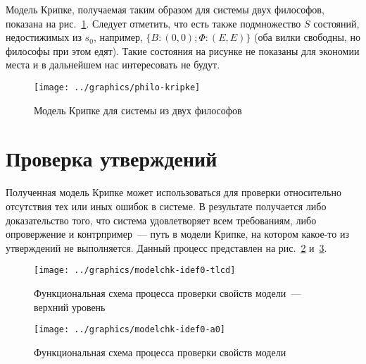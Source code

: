 Модель Крипке, получаемая таким образом для системы двух философов, показана на
рис.~\ref{fig:philo2-kripke}. Следует отметить, что есть также подмножество $S$ состояний,
недостижимых из $s_0$, например, $\{B: (0, 0); \Phi: (E, E)\}$ (оба вилки свободны, но
философы при этом едят). Такие состояния на рисунке не показаны для экономии места и в
дальнейшем нас интересовать не будут.

\begin{figure}[ht]
  \centering
  \texttt{[image: ../graphics/philo-kripke]}
  \caption{Модель Крипке для системы из двух философов}
  \label{fig:philo2-kripke}
\end{figure}

\section{Проверка утверждений}
\label{sec:kripke-verification}

Полученная модель Крипке может использоваться для проверки относительно отсутствия тех или
иных ошибок в системе. В результате получается либо доказательство того, что система
удовлетворяет всем требованиям, либо опровержение и контрпример~--- путь в модели Крипке,
на котором какое-то из утверждений не выполняется. Данный процесс представлен на
рис.~\ref{fig:modelchk-idef0-tlcd} и~\ref{fig:modelchk-idef0-a0}.

\begin{figure}[htb]
  \centering
  \texttt{[image: ../graphics/modelchk-idef0-tlcd]}
  \caption{Функциональная схема процесса проверки свойств модели~--- верхний уровень}
  \label{fig:modelchk-idef0-tlcd}
\end{figure}

\begin{figure}[htb]
  \centering
  \texttt{[image: ../graphics/modelchk-idef0-a0]}
  \caption{Функциональная схема процесса проверки свойств модели}
  \label{fig:modelchk-idef0-a0}
\end{figure}

